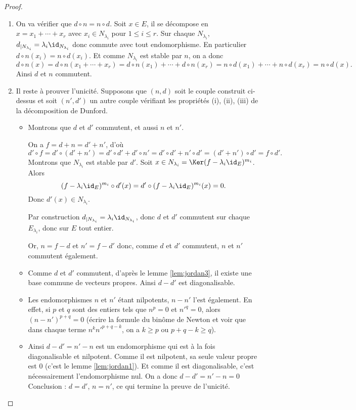 \documentclass[12pt, class=report,crop=false]{standalone}
\begin{document}
\begin{proof}
\begin{enumerate}
  \item On va vérifier que $d\circ n=n\circ d$. Soit $x\in E$, il se décompose
  en $x=x_1+\cdots+x_r$ avec $x_i\in N_{\lambda_i}$ pour $1\le i\le r$.
  Sur chaque $N_{\lambda_i}$, $d_{|N_{\lambda_i}}=\lambda_i\id_{N_{\lambda_i}}$ donc commute avec tout endomorphisme. 
  En particulier $d\circ n(x_i)=n\circ d(x_i)$.  
  Et comme $N_{\lambda_i}$ est stable par $n$, on a donc
  $$d\circ n(x)= d\circ n(x_1+\cdots+x_r)
  =d\circ n(x_1)+\cdots+d\circ n(x_r)=n\circ d(x_1)+\cdots+n\circ d(x_r)=n\circ d(x).$$
  Ainsi $d$ et $n$ commutent.

  \item  Il reste à prouver l'unicité. Supposons que $(n,d)$ soit le couple construit ci-dessus et soit $(n',d')$ un autre couple vérifiant les propriétés (i), (ii), (iii) de la décomposition de Dunford.
  \begin{itemize}
    \item Montrons que $d$ et $d'$ commutent, et aussi $n$ et $n'$.
    
    On a $f=d+n=d'+n'$, d'où 
    $$d'\circ f=d'\circ (d'+n') = d'\circ d'+d'\circ n'
    =d'\circ d'+n'\circ d' = (d'+n')\circ d' =f\circ d'.$$ 
    Montrons que $N_{\lambda_i}$ est stable par $d'$. 
    Soit $x\in N_{\lambda_i}= \Ker (f-\lambda_i\id_E)^{m_i}$. Alors
$$(f-\lambda_i\id_E)^{m_i}\circ d'(x)=d'\circ(f-\lambda_i\id_E)^{m_i}(x)=0.$$
Donc $d'(x) \in N_{\lambda_i}$.

    Par construction $d_{|N_{\lambda_i}}=\lambda_i\id_{N_{\lambda_i}}$, donc $d$ et $d'$ commutent sur chaque 
    $E_{\lambda_i}$, donc sur $E$ tout entier.
    
    Or, $n=f-d$ et $n'=f-d'$ donc, comme $d$ et $d'$ commutent, $n$ et $n'$ commutent également. 
    
    \item Comme $d$ et $d'$ commutent, d'après le lemme \ref{lem:jordan3}, il existe une base commune de vecteurs propres. Ainsi $d-d'$ est diagonalisable. 
    
    \item Les endomorphismes $n$ et $n'$ étant nilpotents, $n-n'$ l'est également. En effet, si $p$ et $q$ sont des entiers tels que $n^p=0$ et $n'^q=0$, alors $(n-n')^{p+q}=0$ (écrire la formule du binôme de Newton et voir que dans chaque terme $n^k n'^{p+q-k}$, on a $k \ge p$ ou $p+q-k\ge q$).
    
    
    \item  Ainsi $d-d'=n'-n$ est un endomorphisme qui est à la fois diagonalisable et nilpotent.
    Comme il est nilpotent, sa seule valeur propre est $0$ (c'est le lemme \ref{lem:jordan1}).
    Et comme il est diagonalisable, c'est nécessairement l'endomorphisme nul. On a donc $d-d'=n'-n=0$
    Conclusion : $d=d'$, $n=n'$, ce qui termine la preuve de l'unicité. 
    
  \end{itemize}
   
\end{enumerate}
\end{proof}
\end{document}
